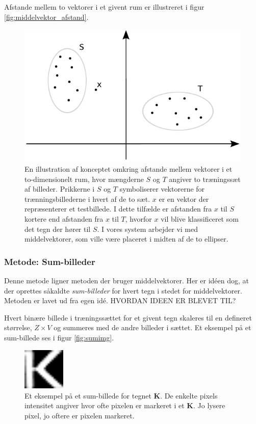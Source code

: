 Afstande mellem to vektorer i et givent rum er illustreret i figur \vref{fig:middelvektor_afstand}.

\begin{figure}[htp]
\centering
\includegraphics{system/illu/middelvektor_afstand.pdf} 
\caption{En illustration af konceptet omkring afstande mellem vektorer i et to-dimensionelt rum, hvor mængderne $S$ og $T$ angiver to træningssæt af billeder. Prikkerne i $S$ og $T$ symboliserer vektorerne for trænningsbillederne i hvert af de to sæt. $x$ er en vektor der repræsenterer et testbillede. I dette tilfælde er afstanden fra $x$ til $S$ kortere end afstanden fra $x$ til $T$, hvorfor $x$ vil blive klassificeret som det tegn der hører til $S$. I vores system arbejder vi med middelvektorer, som ville være placeret i midten af de to ellipser.}
\label{fig:middelvektor_afstand}
\end{figure}

\subsubsection*{Metode: Sum-billeder}

Denne metode ligner metoden der bruger middelvektorer. Her er idéen dog, at der oprettes såkaldte \textit{sum-billeder} for hvert tegn i stedet for middelvektorer. Metoden er lavet ud fra egen idé. HVORDAN IDEEN ER BLEVET TIL?

Hvert binære billede i træningssættet for et givent tegn skaleres til en defineret størrelse, $Z \times V$ og summeres med de andre billeder i sættet. Et eksempel på et sum-billede ses i figur \vref{fig:sumimg}.

\begin{figure}[htp]
\centering
\includegraphics[width=2cm]{system/illu/sumimg.png} 
\caption{Et eksempel på et sum-billede for tegnet \textbf{K}. De enkelte pixels intensitet angiver hvor ofte pixelen er markeret i et \textbf{K}. Jo lysere pixel, jo oftere er pixelen markeret.}
\label{fig:sumimg}
\end{figure}

